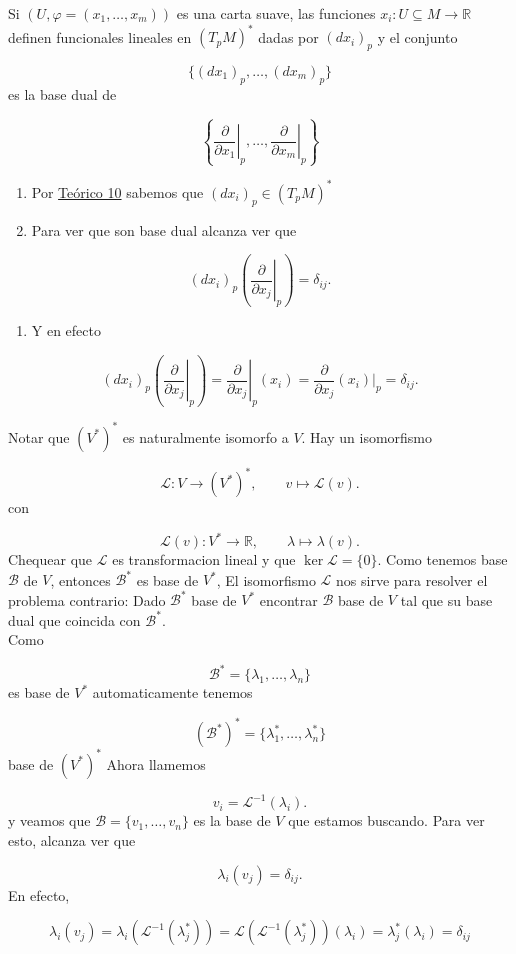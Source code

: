 \label{blk:14f1f6}
\begin{bookproposition}{}
Si $(U,\varphi=(x_1,\ldots,x_m))$ es una carta suave, las funciones $x_{i}:U\subseteq M\rightarrow\mathbb{R}$ definen funcionales lineales en $(T_{p}M)^{*}$ dadas por $(dx_{i})_{p}$ y el conjunto

\[
\{(dx_1)_p,\ldots,(dx_m)_p\}
\]
es la base dual de

\[
\left\{\left.\frac{\partial}{\partial x_1}\right|_p,\ldots,\left.\frac{\partial}{\partial x_m}\right|_p\right\}
\]
\end{bookproposition}
\begin{bookproof}{}
\begin{enumerate}
\item Por \hyperref[blk:14f1f6]{Teórico 10} sabemos que $(dx_{i})_{p}\in (T_pM)^{*}$
\item Para ver que son base dual alcanza ver que
\end{enumerate}
\[
(dx_i)_p\left(\left.\frac{\partial}{\partial x_j}\right|_p\right)=\delta_{ij}.
\]
\begin{enumerate}[start=3]
\item Y en efecto
\end{enumerate}
\[
(dx_i)_p\left(\left.\frac{\partial}{\partial x_j}\right|_p\right)=\left.\frac{\partial}{\partial x_j}\right|_p(x_i)=\frac{\partial}{\partial x_j}(x_i)\Big|_p=\delta_{ij}.
\]
\bookqed
\end{bookproof}
\label{blk:base-dual-coordenadas}
\begin{bookremark}{}
Notar que $(V^*)^*$ es naturalmente isomorfo a $V$. Hay un isomorfismo

\[
\mathcal L:V \to (V^*)^*,\qquad v \mapsto \mathcal L(v).
\]
con

\[
\mathcal L(v):V^* \to \mathbb R,\qquad \lambda \mapsto \lambda(v).
\]
Chequear que $\mathcal L$ es transformacion lineal y que $\ker \mathcal L=\{0\}$. Como tenemos base $\mathcal B$ de $V$, entonces $\mathcal B^*$ es base de $V^*$, El isomorfismo $\mathcal L$ nos sirve para resolver el problema contrario: Dado $\mathcal B^{*}$ base de $V^{*}$ encontrar $\mathcal B$ base de $V$ tal que su base dual que coincida con $\mathcal B^{*}$.\\
Como

\[
\mathcal B^*=\{\lambda_1,\ldots,\lambda_n\}
\]
es base de $V^{*}$ automaticamente tenemos

\[
(\mathcal B^*)^*=\{\lambda_1^{*} ,\ldots,\lambda_n^{*} \}
\]
base de $(V^{*})^{*}$ Ahora llamemos

\[
v_i=\mathcal L^{-1}(\lambda_i).
\]
y veamos que $\mathcal B=\{v_1,\ldots,v_n\}$ es la base de $V$ que estamos buscando. Para ver esto, alcanza ver que

\[
\lambda_i(v_j)=\delta_{ij}.
\]
En efecto,

\[
\lambda_i(v_j)=\lambda_i(\mathcal L^{-1}(\lambda_j^{*} ))=\mathcal L(\mathcal L^{-1}(\lambda_{j}^{*} ) )(\lambda_{i})=\lambda_{j}^{*} (\lambda_{i})=\delta_{ij}
\]
\end{bookremark}
